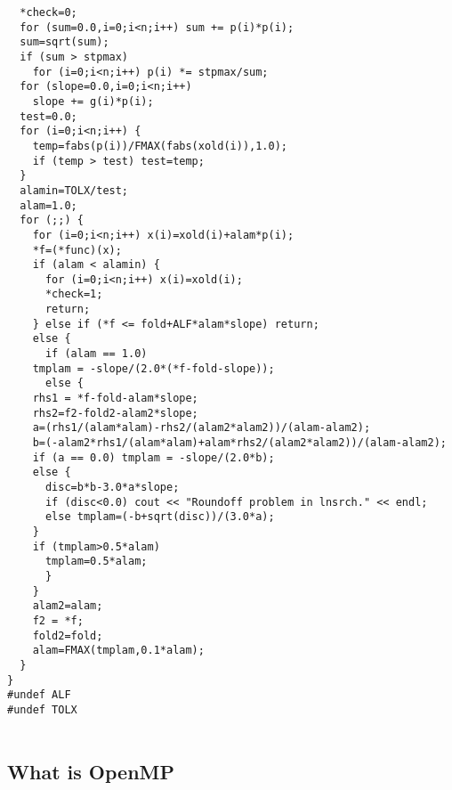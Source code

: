 \documentclass[%
oneside,                 %
final,                   %
10pt]{article}
\begin{document}
\begin{verbatim}
  *check=0;
  for (sum=0.0,i=0;i<n;i++) sum += p(i)*p(i);
  sum=sqrt(sum);
  if (sum > stpmax)
    for (i=0;i<n;i++) p(i) *= stpmax/sum;
  for (slope=0.0,i=0;i<n;i++)
    slope += g(i)*p(i);
  test=0.0;
  for (i=0;i<n;i++) {
    temp=fabs(p(i))/FMAX(fabs(xold(i)),1.0);
    if (temp > test) test=temp;
  }
  alamin=TOLX/test;
  alam=1.0;
  for (;;) {
    for (i=0;i<n;i++) x(i)=xold(i)+alam*p(i);
    *f=(*func)(x);
    if (alam < alamin) {
      for (i=0;i<n;i++) x(i)=xold(i);
      *check=1;
      return;
    } else if (*f <= fold+ALF*alam*slope) return;
    else {
      if (alam == 1.0)
	tmplam = -slope/(2.0*(*f-fold-slope));
      else {
	rhs1 = *f-fold-alam*slope;
	rhs2=f2-fold2-alam2*slope;
	a=(rhs1/(alam*alam)-rhs2/(alam2*alam2))/(alam-alam2);
	b=(-alam2*rhs1/(alam*alam)+alam*rhs2/(alam2*alam2))/(alam-alam2);
	if (a == 0.0) tmplam = -slope/(2.0*b);
	else {
	  disc=b*b-3.0*a*slope;
	  if (disc<0.0) cout << "Roundoff problem in lnsrch." << endl;
	  else tmplam=(-b+sqrt(disc))/(3.0*a);
	}
	if (tmplam>0.5*alam)
	  tmplam=0.5*alam;
      }
    }
    alam2=alam;
    f2 = *f;
    fold2=fold;
    alam=FMAX(tmplam,0.1*alam);
  }
}
#undef ALF
#undef TOLX


\end{verbatim}



\subsection*{What is OpenMP}

\end{document}
